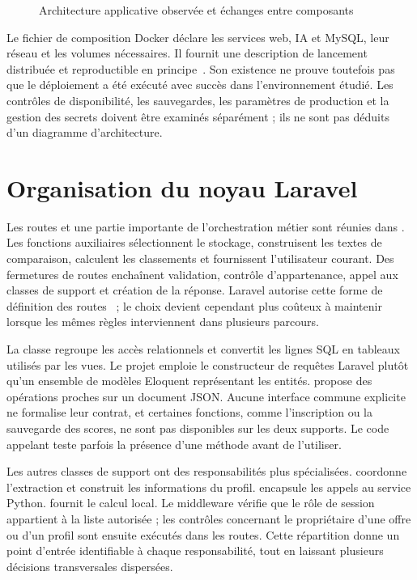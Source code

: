 \begin{figure}[htbp]
\centering

\caption{Architecture applicative observée et échanges entre composants}
\label{fig:architecture-conception}
\end{figure}

Le fichier de composition Docker déclare les services web, IA et MySQL, leur réseau et les volumes nécessaires. Il fournit une description de lancement distribuée et reproductible en principe~\cite{docker-compose}. Son existence ne prouve toutefois pas que le déploiement a été exécuté avec succès dans l'environnement étudié. Les contrôles de disponibilité, les sauvegardes, les paramètres de production et la gestion des secrets doivent être examinés séparément ; ils ne sont pas déduits d'un diagramme d'architecture.

\section{Organisation du noyau Laravel}

Les routes et une partie importante de l'orchestration métier sont réunies dans . Les fonctions auxiliaires sélectionnent le stockage, construisent les textes de comparaison, calculent les classements et fournissent l'utilisateur courant. Des fermetures de routes enchaînent validation, contrôle d'appartenance, appel aux classes de support et création de la réponse. Laravel autorise cette forme de définition des routes~\cite{laravel-routing} ; le choix devient cependant plus coûteux à maintenir lorsque les mêmes règles interviennent dans plusieurs parcours.

La classe  regroupe les accès relationnels et convertit les lignes SQL en tableaux utilisés par les vues. Le projet emploie le constructeur de requêtes Laravel plutôt qu'un ensemble de modèles Eloquent représentant les entités.  propose des opérations proches sur un document JSON. Aucune interface commune explicite ne formalise leur contrat, et certaines fonctions, comme l'inscription ou la sauvegarde des scores, ne sont pas disponibles sur les deux supports. Le code appelant teste parfois la présence d'une méthode avant de l'utiliser.

Les autres classes de support ont des responsabilités plus spécialisées.  coordonne l'extraction et construit les informations du profil.  encapsule les appels au service Python.  fournit le calcul local. Le middleware  vérifie que le rôle de session appartient à la liste autorisée ; les contrôles concernant le propriétaire d'une offre ou d'un profil sont ensuite exécutés dans les routes. Cette répartition donne un point d'entrée identifiable à chaque responsabilité, tout en laissant plusieurs décisions transversales dispersées.

